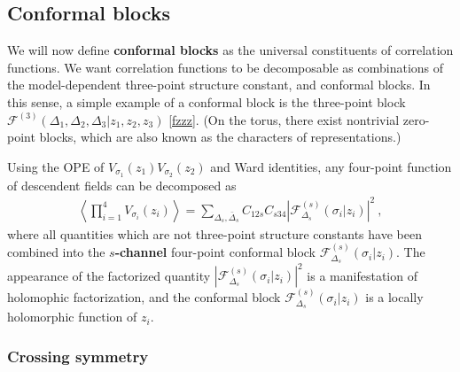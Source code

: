 \documentclass[12pt, a4paper, notitlepage, twoside]{report}
\numberwithin{equation}{section}
\theoremstyle{break}
\begin{document}
\subsection{Conformal blocks \label{secaco}}

We will now define \textbf{\boldmath conformal blocks} as the universal constituents of correlation functions. 
We want correlation functions to be decomposable as combinations of the model-dependent three-point structure constant, and conformal blocks.
In this sense, a simple example of a conformal block is the three-point block $\mathcal{F}^{(3)}(\Delta_1,\Delta_2,\Delta_3|z_1,z_2,z_3)$ \eqref{fzzz}. (On the torus, there exist nontrivial zero-point blocks, which are also known as the characters of representations.)

Using the OPE of $V_{\sigma_1}(z_1)V_{\sigma_2}(z_2)$ and Ward identities, any four-point function of descendent fields can be decomposed as 
\begin{align}
 \left\langle \prod_{i=1}^4 V_{\sigma_i}(z_i)\right\rangle 
 = \sum_{\Delta_s,\bar{\Delta}_s} C_{12s} C_{s34} \left| \mathcal{F}^{(s)}_{\Delta_s}(\sigma_i|z_i)\right|^2\ ,
\label{fsd}
\end{align}
where all quantities which are not three-point structure constants have been combined into the \textbf{\boldmath $s$-channel} four-point conformal block $\mathcal{F}^{(s)}_{\Delta_s}(\sigma_i|z_i)$.
The appearance of the factorized quantity $\left| \mathcal{F}^{(s)}_{\Delta_s}(\sigma_i|z_i)\right|^2$ is a manifestation of holomophic factorization, and the conformal block $\mathcal{F}^{(s)}_{\Delta_s}(\sigma_i|z_i)$ is a locally holomorphic function of $z_i$. 

\subsubsection{Crossing symmetry}
\end{document}

